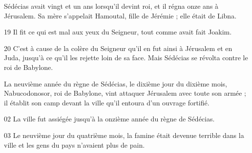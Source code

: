 Sédécias avait vingt et un ans lorsqu’il devint roi, et il régna onze ans à Jérusalem. Sa mère s’appelait Hamoutal, fille de Jérémie ; elle était de Libna.

19 Il fit ce qui est mal aux yeux du Seigneur, tout comme avait fait Joakim.

20 C’est à cause de la colère du Seigneur qu’il en fut ainsi à Jérusalem et en Juda, jusqu’à ce qu’il les rejette loin de sa face. Mais Sédécias se révolta contre le roi de Babylone.

La neuvième année du règne de Sédécias, le dixième jour du dixième mois, Nabucodonosor, roi de Babylone, vint attaquer Jérusalem avec toute son armée ; il établit son camp devant la ville qu’il entoura d’un ouvrage fortifié.

02 La ville fut assiégée jusqu’à la onzième année du règne de Sédécias.

03 Le neuvième jour du quatrième mois, la famine était devenue terrible dans la ville et les gens du pays n’avaient plus de pain.
